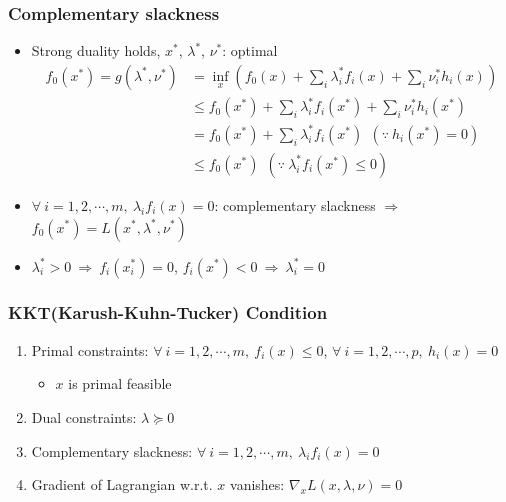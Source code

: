 \subsubsection*{Complementary slackness}
\begin{itemize}
    \item Strong duality holds, $x^\ast$, $\lambda^\ast$, $\nu^\ast$: optimal
    $$ \begin{aligned}
        f_0(x^\ast)=g(\lambda^\ast,\nu^\ast) &= \inf_{x} \left(f_0(x)+\sum_{i}\lambda_i^\ast f_i(x)+\sum_i \nu_i^\ast h_i(x)\right) \\
            &\leq f_0(x^\ast)+\sum_{i}\lambda_i^\ast f_i(x^\ast)+\sum_i \nu_i^\ast h_i(x^\ast) \\
            &= f_0(x^\ast)+\sum_{i}\lambda_i^\ast f_i(x^\ast)~~(\because~h_i(x^\ast)=0) \\
            &\leq f_0(x^\ast)~~(\because~\lambda_i^\ast f_i(x^\ast)\leq 0)
    \end{aligned} $$
    \item $\forall~i=1,2,\cdots,m,~\lambda_i f_i(x) = 0$: complementary slackness $\Rightarrow$ $f_0(x^\ast) = L(x^\ast,\lambda^\ast,\nu^\ast)$
    \item $\lambda_i^\ast>0~\Rightarrow~f_i(x_i^\ast)=0$, $f_i(x^\ast)<0~\Rightarrow~\lambda_i^\ast=0$
\end{itemize}

\subsubsection*{KKT(Karush-Kuhn-Tucker) Condition}
\begin{enumerate}
    \item Primal constraints: $\forall~i=1,2,\cdots,m,~f_i(x)\leq 0$, $\forall~i=1,2,\cdots,p,~h_i(x)=0$
    \begin{itemize}
        \item $x$ is primal feasible
    \end{itemize}
    \item Dual constraints: $\lambda\succeq 0$
    \item Complementary slackness: $\forall~i=1,2,\cdots,m,~\lambda_i f_i(x) = 0$
    \item Gradient of Lagrangian w.r.t. $x$ vanishes: $\nabla_x L(x,\lambda,\nu) = 0$
\end{enumerate}

